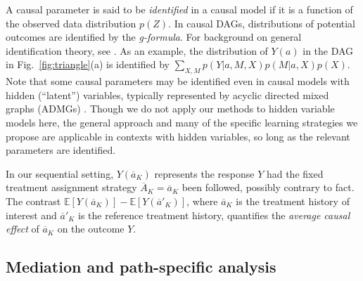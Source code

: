\documentclass{article}
\newcommand{\E}{\mathbb{E}}
\DeclareMathOperator{\pa}{pa}
\begin{document}
A causal parameter is said to be \emph{identified} in a causal model if it is a function of the observed data distribution $p(Z)$. In causal DAGs, distributions of potential outcomes are identified by the \emph{g-formula}. For background on general identification theory, see \citet{shpitser18identification}.
As an example, the distribution of $Y(a)$ in the DAG in Fig.~\ref{fig:triangle}(a) %
is identified by $\sum_{X,M} p(Y | a,M,X) p(M | a,X) p(X)$.
Note that some causal parameters may be identified even in causal models with hidden (``latent'') variables, typically represented by acyclic directed mixed graphs (ADMGs) \citep{shpitser18identification}. Though we do not apply our methods to hidden variable models here, the general approach and many of the specific learning strategies we propose are applicable in contexts with hidden variables, so long as the relevant parameters are identified.

In our sequential setting,
$Y(\overline{a}_K)$ represents the response $Y$ had the fixed treatment assignment strategy $\overline{A}_K = \overline{a}_K$ been followed, possibly contrary to fact.  The contrast %
$\E[Y(\overline{a}_K)] - \E[Y(\overline{a}'_K)]$, where $\overline{a}_K$ is the treatment history of interest and $\overline{a}'_K$ is the reference treatment history, quantifies the \emph{average causal effect} of $\overline{a}_K$ on the outcome $Y$.

\subsection*{Mediation and path-specific analysis}
\end{document}
